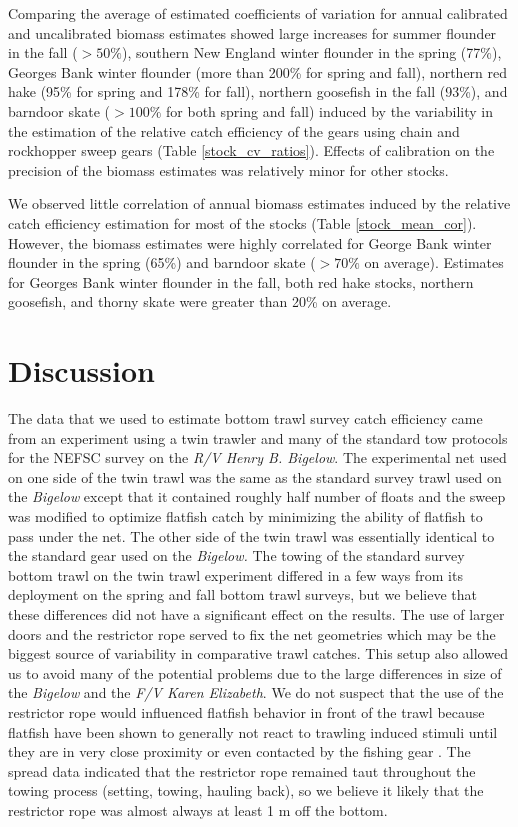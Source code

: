 \documentclass[
  12pt,
]{article}
\begin{document}
Comparing the average of estimated coefficients of variation for annual
calibrated and uncalibrated biomass estimates showed large increases for
summer flounder in the fall (\(> 50\%\)), southern New England winter
flounder in the spring (77\%), Georges Bank winter flounder (more than
200\% for spring and fall), northern red hake (95\% for spring and 178\%
for fall), northern goosefish in the fall (93\%), and barndoor skate
(\(>100\%\) for both spring and fall) induced by the variability in the
estimation of the relative catch efficiency of the gears using chain and
rockhopper sweep gears (Table \ref{stock_cv_ratios}). Effects of
calibration on the precision of the biomass estimates was relatively
minor for other stocks.

We observed little correlation of annual biomass estimates induced by
the relative catch efficiency estimation for most of the stocks (Table
\ref{stock_mean_cor}). However, the biomass estimates were highly
correlated for George Bank winter flounder in the spring (65\%) and
barndoor skate (\(>70\%\) on average). Estimates for Georges Bank winter
flounder in the fall, both red hake stocks, northern goosefish, and
thorny skate were greater than 20\% on average.

\hypertarget{discussion}{%
\section{Discussion}\label{discussion}}

The data that we used to estimate bottom trawl survey catch efficiency
came from an experiment using a twin trawler and many of the standard
tow protocols for the NEFSC survey on the \emph{R/V Henry B. Bigelow}.
The experimental net used on one side of the twin trawl was the same as
the standard survey trawl used on the \emph{Bigelow} except that it
contained roughly half number of floats and the sweep was modified to
optimize flatfish catch by minimizing the ability of flatfish to pass
under the net. The other side of the twin trawl was essentially
identical to the standard gear used on the \emph{Bigelow.} The towing of
the standard survey bottom trawl on the twin trawl experiment differed
in a few ways from its deployment on the spring and fall bottom trawl
surveys, but we believe that these differences did not have a
significant effect on the results. The use of larger doors and the
restrictor rope served to fix the net geometries which may be the
biggest source of variability in comparative trawl catches. This setup
also allowed us to avoid many of the potential problems due to the large
differences in size of the \emph{Bigelow} and the \emph{F/V Karen
Elizabeth}. We do not suspect that the use of the restrictor rope would
influenced flatfish behavior in front of the trawl because flatfish have
been shown to generally not react to trawling induced stimuli until they
are in very close proximity or even contacted by the fishing gear
\citep{ryeretal10}. The spread data indicated that the restrictor rope
remained taut throughout the towing process (setting, towing, hauling
back), so we believe it likely that the restrictor rope was almost
always at least 1 m off the bottom.
\end{document}
